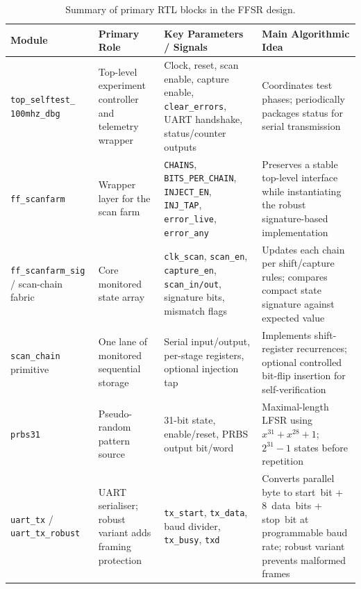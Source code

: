 \begin{table}[htbp]
    \centering
    \caption{Summary of primary RTL blocks in the FFSR design.}
    \label{tab:ch6_modules}
    \small
    \begin{tabular}{p{3.0cm} p{2.8cm} p{3.4cm} p{4.0cm}}
        \toprule
        \textbf{Module} &
        \textbf{Primary Role} &
        \textbf{Key Parameters / Signals} &
        \textbf{Main Algorithmic Idea} \\
        \midrule
        \texttt{top\_selftest\_ 100mhz\_dbg} &
        Top-level experiment controller and telemetry wrapper &
        Clock, reset, scan enable, capture enable, \texttt{clear\_errors}, UART handshake, status/counter outputs &
        Coordinates test phases; periodically packages status for serial transmission \\
        \addlinespace
        \texttt{ff\_scanfarm} &
        Wrapper layer for the scan farm &
        \texttt{CHAINS}, \texttt{BITS\_PER\_CHAIN}, \texttt{INJECT\_EN}, \texttt{INJ\_TAP}, \texttt{error\_live}, \texttt{error\_any} &
        Preserves a stable top-level interface while instantiating the robust signature-based implementation \\
        \addlinespace
        \texttt{ff\_scanfarm\_sig} / scan-chain fabric &
        Core monitored state array &
        \texttt{clk\_scan}, \texttt{scan\_en}, \texttt{capture\_en}, \texttt{scan\_in/out}, signature bits, mismatch flags &
        Updates each chain per shift/capture rules; compares compact state signature against expected value \\
        \addlinespace
        \texttt{scan\_chain} primitive &
        One lane of monitored sequential storage &
        Serial input/output, per-stage registers, optional injection tap &
        Implements shift-register recurrences; optional controlled bit-flip insertion for self-verification \\
        \addlinespace
        \texttt{prbs31} &
        Pseudo-random pattern source &
        31-bit state, enable/reset, PRBS output bit/word &
        Maximal-length LFSR using $x^{31}+x^{28}+1$; $2^{31}-1$ states before repetition \\
        \addlinespace
        \texttt{uart\_tx} / \texttt{uart\_tx\_robust} &
        UART serialiser; robust variant adds framing protection &
        \texttt{tx\_start}, \texttt{tx\_data}, baud divider, \texttt{tx\_busy}, \texttt{txd} &
        Converts parallel byte to start~bit + 8~data~bits + stop~bit at programmable baud rate; robust variant prevents malformed frames \\
        \bottomrule
    \end{tabular}
\end{table}

